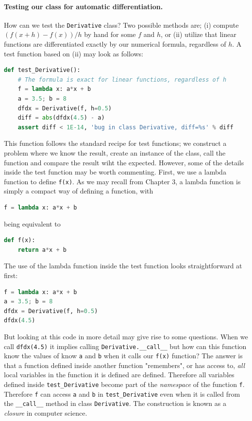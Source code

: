 \documentclass[graybox,envcountchap,sectrefs,final]{svmonodo}
\begin{document}
\paragraph{Testing our class for automatic differentiation.}
How can we test the \texttt{Derivative} class? Two possible methods are; (i) compute $(f(x+h)-f(x))/h$ by hand for
some $f$ and $h$, or (ii) utilize that linear functions are differentiated exactly by our numerical formula,
regardless of $h$. A test function based on (ii) may look as follows:
\begin{lstlisting}[language=Python,style=blue1]
def test_Derivative():
    # The formula is exact for linear functions, regardless of h
    f = lambda x: a*x + b
    a = 3.5; b = 8
    dfdx = Derivative(f, h=0.5)
    diff = abs(dfdx(4.5) - a)
    assert diff < 1E-14, 'bug in class Derivative, diff=%s' % diff
\end{lstlisting}
This function follows the standard recipe for test functions; we construct a problem where we know the result, create an
instance of the class, call the function and compare the result wiht the expected. However, some of the details inside
the test function may be worth commenting. First, we use a lambda function to define \texttt{f(x)}. As we may recall from Chapter 3,
a lambda function is simply a compact way of defining a function, with
\begin{lstlisting}[language=Python,style=blue1]
f = lambda x: a*x + b
\end{lstlisting}
being equivalent to
\begin{lstlisting}[language=Python,style=blue1]
def f(x):
    return a*x + b
\end{lstlisting}
The use of the lambda function inside the test function looks straightforward at first:
\begin{lstlisting}[language=Python,style=blue1]
f = lambda x: a*x + b
a = 3.5; b = 8
dfdx = Derivative(f, h=0.5)
dfdx(4.5)
\end{lstlisting}
But looking at this code in more detail may give rise to some questions. When we call \texttt{dfdx(4.5)} it implies
calling \Verb!Derivative.__call__! but how can this function know the values of know \texttt{a} and \texttt{b} when it calls our \texttt{f(x)} function?
The answer is that a function defined inside another function "remembers", or has access to,
\emph{all} local variables in the function it is defined are defined. Therefore all variables defined inside \Verb!test_Derivative!
become part of the \emph{namespace} of the function \texttt{f}. Therefore \texttt{f} can access \texttt{a} and \texttt{b} in \Verb!test_Derivative! even when it is
called from the \Verb!__call__! method in class \texttt{Derivative}. The construction is known as a \emph{closure} in computer science.
\end{document}

